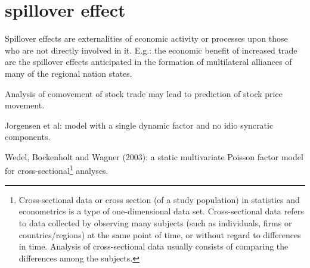 \section{spillover effect}
Spillover effects are externalities of economic activity or processes upon those who are not directly involved in it. E.g.: the economic benefit of increased trade are the spillover effects anticipated in the formation of multilateral alliances of many of the regional nation states.

Analysis of comovement of stock trade may lead to prediction of stock price movement. 

Jorgensen et al: model with a single dynamic factor and no idio syncratic components.

Wedel, Bockenholt and Wagner (2003): a static multivariate Poisson factor model for cross-sectional\footnote{Cross-sectional data or cross section (of a study population) in statistics and econometrics is a type of one-dimensional data set. Cross-sectional data refers to data collected by observing many subjects (such as individuals, firms or countries/regions) at the same point of time, or without regard to differences in time. Analysis of cross-sectional data usually consists of comparing the differences among the subjects.} analyses.


